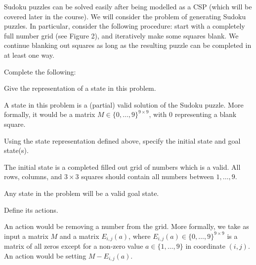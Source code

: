 \begin{enumerate}
    Sudoku puzzles can be solved easily after being modelled as a CSP (which will be covered later in the course). We will consider the problem of generating Sudoku puzzles. In particular, consider the following procedure: start with a completely full number grid (see Figure 2), and iteratively make some squares blank. We continue blanking out squares as long as the resulting puzzle can be completed in at least one way.

    Complete the following:
    
    \begin{listu}
        \item Give the representation of a state in this problem.

        \begin{solution}
            A state in this problem is a (partial) valid solution of the Sudoku puzzle. More formally, it would be a matrix $M \in \{ 0, \dots , 9 \}^{9\times9}$, with $0$ representing a blank square.
        \end{solution}

        \item Using the state representation defined above, specify the initial state and goal state(s).

        \begin{solution}
            \null

            \begin{listu}
                \item The initial state is a completed filled out grid of numbers which is a valid. All rows, columns, and $3 \times 3$ squares should contain all numbers between $1, \dots, 9$. 
                \item Any state in the problem will be a valid goal state.
            \end{listu}
        \end{solution}

        \item Define its actions.

        \begin{solution}
            An action would be removing a number from the grid. More formally, we take as input a matrix $M$ and a matrix $E_{i,j}(a)$, where $E_{i,j}(a) \in \{ 0, \dots, 9 \}^{9 \times 9}$ is a matrix of all zeros except for a non-zero value $a \in \{ 1, \dots, 9 \}$ in coordinate $(i, j)$. An action would be setting $M - E_{i,j}(a)$.
        \end{solution}


\end{listu}
\end{enumerate}

